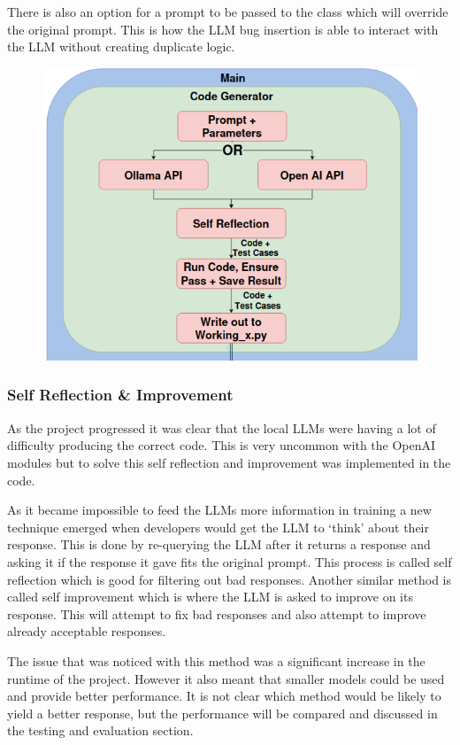 \documentclass[12pt]{extarticle}
\begin{document}
There is also an option for a prompt to be passed to the class which will override the original prompt. This is how the LLM bug insertion is able to interact with the LLM without creating duplicate logic. 

\begin{figure}[htbp]
\centering
\includegraphics[width=0.7\linewidth]{Images/Code_Generator.png}
\label{fig:code_generator}
\end{figure}

\subsubsection{Self Reflection \& Improvement}

As the project progressed it was clear that the local LLMs were having a lot of difficulty producing the correct code. This is very uncommon with the OpenAI modules but to solve this self reflection and improvement was implemented in the code. 

As it became impossible to feed the LLMs more information in training a new technique emerged when developers would get the LLM to `think' about their response. This is done by re-querying the LLM after it returns a response and asking it if the response it gave fits the original prompt. This process is called self reflection \cite{shinn2023} which is good for filtering out bad responses. Another similar method is called self improvement which is where the LLM is asked to improve on its response. This will attempt to fix bad responses and also attempt to improve already acceptable responses.

The issue that was noticed with this method was a significant increase in the runtime of the project. However it also meant that smaller models could be used and provide better performance. It is not clear which method would be likely to yield a better response, but the performance will be compared and discussed in the testing and evaluation section.
\end{document}
